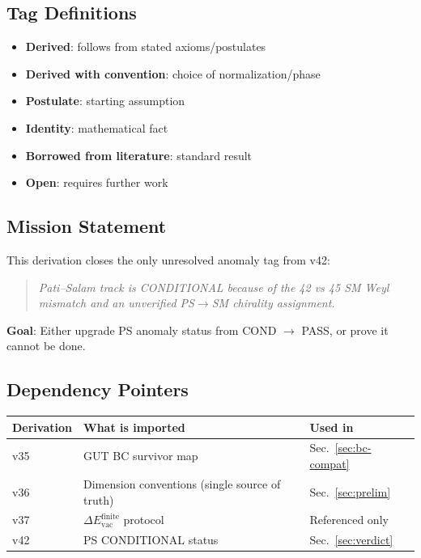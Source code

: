 \documentclass[11pt,a4paper]{article}
\newcommand{\tagD}{\textcolor{blue!70!black}{[D]}}
\newcommand{\tagDc}{\textcolor{blue!50!black}{[Dc]}}
\newcommand{\tagP}{\textcolor{green!50!black}{[P]}}
\newcommand{\tagI}{\textcolor{gray}{[I]}}
\newcommand{\tagBL}{\textcolor{purple}{[BL]}}
\newcommand{\tagOPEN}{\textcolor{red!70!black}{[OPEN]}}
\begin{document}
\subsection{Tag Definitions}

\begin{itemize}[leftmargin=2cm]
    \item[\tagD] \textbf{Derived}: follows from stated axioms/postulates
    \item[\tagDc] \textbf{Derived with convention}: choice of normalization/phase
    \item[\tagP] \textbf{Postulate}: starting assumption
    \item[\tagI] \textbf{Identity}: mathematical fact
    \item[\tagBL] \textbf{Borrowed from literature}: standard result
    \item[\tagOPEN] \textbf{Open}: requires further work
\end{itemize}

\subsection{Mission Statement}

This derivation closes the only unresolved anomaly tag from v42:
\begin{quote}
\textit{Pati--Salam track is CONDITIONAL because of the 42 vs 45 SM Weyl mismatch
and an unverified PS$\to$SM chirality assignment.}
\end{quote}

\textbf{Goal}: Either upgrade PS anomaly status from COND $\to$ PASS, or prove
it cannot be done.

\subsection{Dependency Pointers}

\begin{center}
\begin{tabular}{lll}
\toprule
Derivation & What is imported & Used in \\
\midrule
v35 & GUT BC survivor map & Sec.~\ref{sec:bc-compat} \\
v36 & Dimension conventions (single source of truth) & Sec.~\ref{sec:prelim} \\
v37 & $\Delta E_{\text{vac}}^{\text{finite}}$ protocol & Referenced only \\
v42 & PS CONDITIONAL status & Sec.~\ref{sec:verdict} \\
\bottomrule
\end{tabular}
\end{center}
\end{document}
